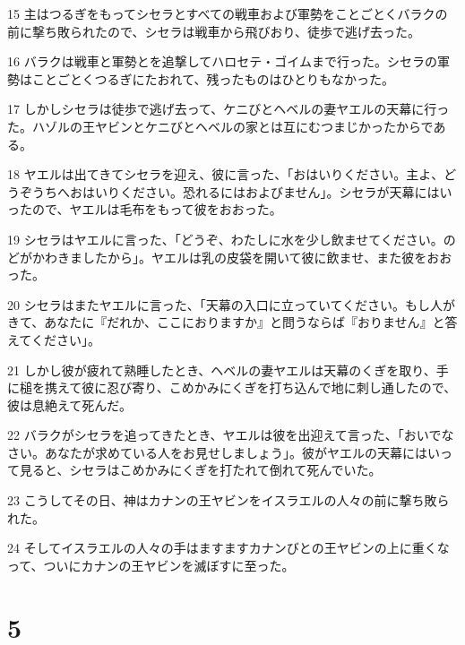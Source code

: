 \par 15 主はつるぎをもってシセラとすべての戦車および軍勢をことごとくバラクの前に撃ち敗られたので、シセラは戦車から飛びおり、徒歩で逃げ去った。
\par 16 バラクは戦車と軍勢とを追撃してハロセテ・ゴイムまで行った。シセラの軍勢はことごとくつるぎにたおれて、残ったものはひとりもなかった。
\par 17 しかしシセラは徒歩で逃げ去って、ケニびとヘベルの妻ヤエルの天幕に行った。ハゾルの王ヤビンとケニびとヘベルの家とは互にむつまじかったからである。
\par 18 ヤエルは出てきてシセラを迎え、彼に言った、「おはいりください。主よ、どうぞうちへおはいりください。恐れるにはおよびません」。シセラが天幕にはいったので、ヤエルは毛布をもって彼をおおった。
\par 19 シセラはヤエルに言った、「どうぞ、わたしに水を少し飲ませてください。のどがかわきましたから」。ヤエルは乳の皮袋を開いて彼に飲ませ、また彼をおおった。
\par 20 シセラはまたヤエルに言った、「天幕の入口に立っていてください。もし人がきて、あなたに『だれか、ここにおりますか』と問うならば『おりません』と答えてください」。
\par 21 しかし彼が疲れて熟睡したとき、ヘベルの妻ヤエルは天幕のくぎを取り、手に槌を携えて彼に忍び寄り、こめかみにくぎを打ち込んで地に刺し通したので、彼は息絶えて死んだ。
\par 22 バラクがシセラを追ってきたとき、ヤエルは彼を出迎えて言った、「おいでなさい。あなたが求めている人をお見せしましょう」。彼がヤエルの天幕にはいって見ると、シセラはこめかみにくぎを打たれて倒れて死んでいた。
\par 23 こうしてその日、神はカナンの王ヤビンをイスラエルの人々の前に撃ち敗られた。
\par 24 そしてイスラエルの人々の手はますますカナンびとの王ヤビンの上に重くなって、ついにカナンの王ヤビンを滅ぼすに至った。

\chapter{5}


